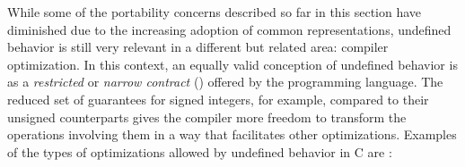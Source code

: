 While some of the portability concerns described so far in this section have
diminished due to the increasing adoption of common representations, undefined
behavior is still very relevant in a different but related area: compiler
optimization.  In this context, an equally valid conception of undefined
behavior is as a \textit{restricted} or \textit{narrow contract}
(\cite{Carruth2016}) offered by the programming language.  The reduced set of
guarantees for signed integers, for example, compared to their unsigned
counterparts gives the compiler more freedom to transform the operations
involving them in a way that facilitates other optimizations.  Examples of the
types of optimizations allowed by undefined behavior in C are \footnotemark:


